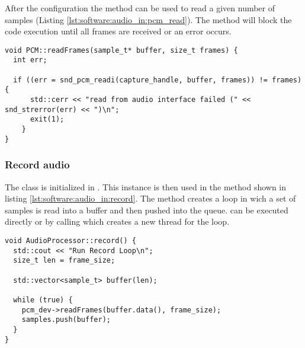 %
After the configuration the method  can be used to read a given number of samples (Listing \ref{lst:software:audio_in:pcm_read}). The method will block the code execution until all frames are received or an error occurs.
%
\begin{mdframed}
\begin{lstlisting}[caption=Method for reading frames from an ALSA device, label=lst:software:audio_in:pcm_read]
void PCM::readFrames(sample_t* buffer, size_t frames) {
  int err;

  if ((err = snd_pcm_readi(capture_handle, buffer, frames)) != frames) {
      std::cerr << "read from audio interface failed (" << snd_strerror(err) << ")\n";
      exit(1);
    }
}
  \end{lstlisting}
\end{mdframed}
%
\subsubsection*{Record audio}
%
The  class is initialized in . This instance is then used in the method  shown in listing \ref{lst:software:audio_in:record}. The method creates a loop in wich a set of samples is read into a buffer and then pushed into the  queue.  can be executed directly or by calling  which creates a new thread for the loop.

\begin{mdframed}
\begin{lstlisting}[caption=Record loop, label=lst:software:audio_in:record]
void AudioProcessor::record() {
  std::cout << "Run Record Loop\n";
  size_t len = frame_size;

  std::vector<sample_t> buffer(len);

  while (true) {
    pcm_dev->readFrames(buffer.data(), frame_size);
    samples.push(buffer);
  }
}
\end{lstlisting}
\end{mdframed}